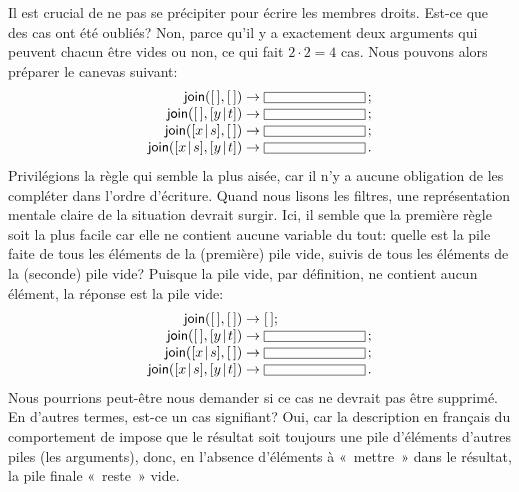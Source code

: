 Il est crucial de ne pas se précipiter pour écrire les membres
droits. Est-ce que des cas ont été oubliés? Non, parce qu'il y a
exactement deux arguments qui peuvent chacun être vides ou non, ce qui
fait \(2 \cdot 2 = 4\) cas. Nous pouvons alors préparer le canevas
suivant:
\begin{equation*}
\begin{array}{r@{\;}l@{\;}l}
\fun{join}(\el,\el) & \rightarrow & \fbcode{CCCCCCCCCC}\,;\\
\fun{join}(\el,\cons{y}{t}) & \rightarrow & \fbcode{CCCCCCCCCC}\,;\\
\fun{join}(\cons{x}{s},\el) & \rightarrow & \fbcode{CCCCCCCCCC}\,;\\
\fun{join}(\cons{x}{s},\cons{y}{t}) & \rightarrow & \fbcode{CCCCCCCCCC}\,.
\end{array}
\end{equation*}
Privilégions la règle qui semble la plus aisée, car il n'y a aucune
obligation de les compléter dans l'ordre d'écriture. Quand nous lisons
les filtres, une représentation mentale claire de la situation devrait
surgir. Ici, il semble que la première règle soit la plus facile car
elle ne contient aucune variable du tout: quelle est la pile faite de
tous les éléments de la (première) pile vide, suivis de tous les
éléments de la (seconde) pile vide? Puisque la pile vide, par
définition, ne contient aucun élément, la réponse est la pile vide:
\begin{equation*}
\begin{array}{r@{\;}l@{\;}l}
\fun{join}(\el,\el) & \rightarrow & \el;\\
\fun{join}(\el,\cons{y}{t}) & \rightarrow & \fbcode{CCCCCCCCCC}\,;\\
\fun{join}(\cons{x}{s},\el) & \rightarrow & \fbcode{CCCCCCCCCC}\,;\\
\fun{join}(\cons{x}{s},\cons{y}{t}) & \rightarrow & \fbcode{CCCCCCCCCC}\,.
\end{array}
\end{equation*}
Nous pourrions peut-être nous demander si ce cas ne devrait pas être
supprimé. En d'autres termes, est-ce un cas signifiant? Oui, car la
description en français du comportement de  impose que le
résultat soit toujours une pile d'éléments d'autres piles (les
arguments), donc, en l'absence d'éléments à «~mettre~» dans le résultat,
la pile finale «~reste~» vide.

